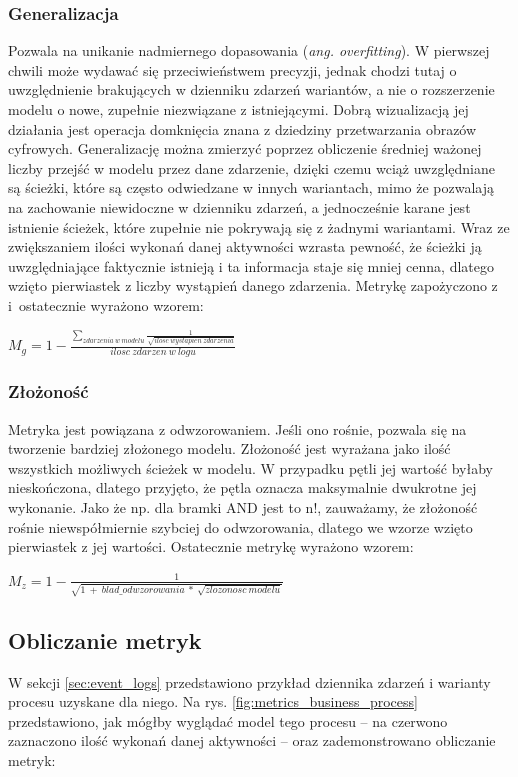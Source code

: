 \subsubsection{Generalizacja}
Pozwala na unikanie nadmiernego dopasowania (\textit{ang. overfitting}). W pierwszej chwili może wydawać się przeciwieństwem precyzji, jednak chodzi tutaj o uwzględnienie brakujących w dzienniku zdarzeń wariantów, a nie o rozszerzenie modelu o nowe, zupełnie niezwiązane z istniejącymi. Dobrą wizualizacją jej działania jest operacja domknięcia znana z dziedziny przetwarzania obrazów cyfrowych. Generalizację można zmierzyć poprzez obliczenie średniej ważonej liczby przejść w modelu przez dane zdarzenie, dzięki czemu wciąż uwzględniane są ścieżki, które są często odwiedzane w innych wariantach, mimo że pozwalają na zachowanie niewidoczne w dzienniku zdarzeń, a jednocześnie karane jest istnienie ścieżek, które zupełnie nie pokrywają się z żadnymi wariantami. Wraz ze zwiększaniem ilości wykonań danej aktywności wzrasta pewność, że ścieżki ją uwzględniające faktycznie istnieją i ta informacja staje się mniej cenna, dlatego wzięto pierwiastek z liczby wystąpień danego zdarzenia. Metrykę zapożyczono z \cite{qd-in-discovery} i~ostatecznie wyrażono wzorem:
\begin{center}
$M_g = 1 - \frac{\sum_{zdarzenia\ w\ modelu} \frac{1}{\sqrt{ilosc\ wystapien\ zdarzenia}}}{ilosc\ zdarzen\ w\ logu} $
\end{center}
\subsubsection{Złożoność}
Metryka jest powiązana z odwzorowaniem. Jeśli ono rośnie, pozwala się na tworzenie bardziej złożonego modelu. Złożoność jest wyrażana jako ilość wszystkich możliwych ścieżek w modelu. W przypadku pętli jej wartość byłaby nieskończona, dlatego przyjęto, że pętla oznacza maksymalnie dwukrotne jej wykonanie. Jako że np. dla bramki AND jest to n!, zauważamy, że złożoność rośnie niewspółmiernie szybciej do odwzorowania, dlatego we wzorze wzięto pierwiastek z jej wartości. Ostatecznie metrykę wyrażono wzorem: 
\begin{center}
$M_z = 1 - \frac{1}{\sqrt{1\ +\ blad\_odwzorowania\ *\ \sqrt{zlozonosc\ modelu}}} $
\end{center}
\subsection{Obliczanie metryk}
W sekcji \ref{sec:event_logs} przedstawiono przykład dziennika zdarzeń i warianty procesu uzyskane dla niego. Na rys. \ref{fig:metrics_business_process} przedstawiono, jak mógłby wyglądać model tego procesu -- na czerwono zaznaczono ilość wykonań danej aktywności -- oraz zademonstrowano obliczanie metryk:
\newline

